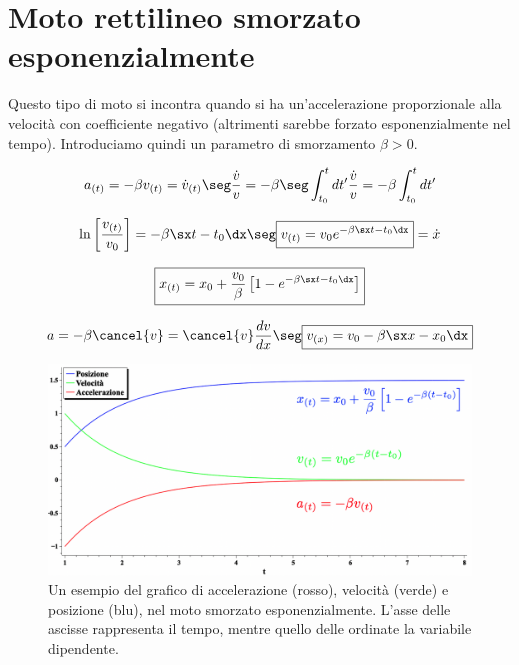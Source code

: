 \section{Moto rettilineo smorzato esponenzialmente}
Questo tipo di moto si incontra quando si ha un'accelerazione proporzionale alla velocità con coefficiente negativo (altrimenti sarebbe forzato esponenzialmente nel tempo). Introduciamo quindi un parametro di smorzamento $\beta>0$.




\begin{equation}
a_{(t)} = -\beta v_{(t)} = \dot v_{(t)}\seg \frac{\dot v}{v} = -\beta \seg \int_{t_0}^{t}dt' \frac{\dot v}{v} =  -\beta\int_{t_0}^{t}dt'
\end{equation}

\begin{equation}
\ln{\left[ \frac{v_{(t)}}{v_0}\right]} = -\beta\sx t-t_0\dx\seg \boxed{v_{(t)} = v_0e^{-\beta\sx t-t_0\dx}} = \dot x 
\end{equation}

\begin{equation}
\boxed{x_{(t)} = x_0 + \frac{v_0}\beta\left[1-e^{-\beta\sx t-t_0\dx}\right]}
\end{equation}

\begin{equation}
a = -\beta \cancel{v} = \cancel{v}\frac{dv}{dx}\seg \boxed{v_{(x)} = v_0 - \beta\sx x - x_0\dx}
\end{equation}

\begin{figure}[htbp]
\begin{center}
\includegraphics[width=13cm]{images/Motosmorz1.png} 
\caption{Un esempio del grafico di accelerazione (rosso), velocità (verde) e posizione (blu), nel moto smorzato esponenzialmente. L'asse delle ascisse rappresenta il tempo, mentre quello delle ordinate la variabile dipendente.}
\label{default}
\end{center}
\end{figure}




